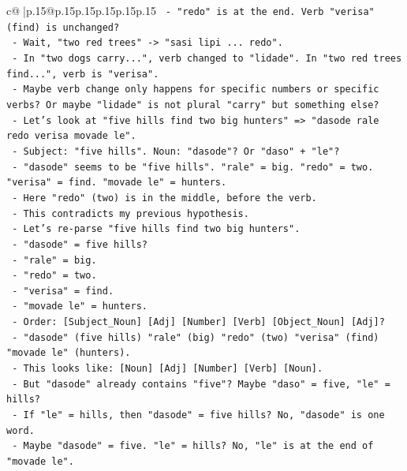 \documentclass{article}
\begin{document}
{\begin{supertabular}{c@{$\;$}|p{.15\linewidth}@{}p{.15\linewidth}p{.15\linewidth}p{.15\linewidth}p{.15\linewidth}p{.15\linewidth}}
{{{\texttt{        {-} "redo" is at the end. Verb "verisa" (find) is unchanged?} \\
\texttt{        {-} Wait, "two red trees" {-}> "sasi lipi ... redo".} \\
\texttt{        {-} In "two dogs carry...", verb changed to "lidade". In "two red trees find...", verb is "verisa".} \\
\texttt{        {-} Maybe verb change only happens for specific numbers or specific verbs? Or maybe "lidade" is not plural "carry" but something else?} \\
\texttt{        {-} Let's look at "five hills find two big hunters" => "dasode rale redo verisa movade le".} \\
\texttt{          {-} Subject: "five hills". Noun: "dasode"? Or "daso" + "le"?} \\
\texttt{          {-} "dasode" seems to be "five hills". "rale" = big. "redo" = two. "verisa" = find. "movade le" = hunters.} \\
\texttt{          {-} Here "redo" (two) is in the middle, before the verb.} \\
\texttt{          {-} This contradicts my previous hypothesis.} \\
\texttt{          {-} Let's re{-}parse "five hills find two big hunters".} \\
\texttt{            {-} "dasode" = five hills?} \\
\texttt{            {-} "rale" = big.} \\
\texttt{            {-} "redo" = two.} \\
\texttt{            {-} "verisa" = find.} \\
\texttt{            {-} "movade le" = hunters.} \\
\texttt{            {-} Order: {[}Subject\_Noun{]} {[}Adj{]} {[}Number{]} {[}Verb{]} {[}Object\_Noun{]} {[}Adj{]}?} \\
\texttt{            {-} "dasode" (five hills) "rale" (big) "redo" (two) "verisa" (find) "movade le" (hunters).} \\
\texttt{            {-} This looks like: {[}Noun{]} {[}Adj{]} {[}Number{]} {[}Verb{]} {[}Noun{]}.} \\
\texttt{            {-} But "dasode" already contains "five"? Maybe "daso" = five, "le" = hills?} \\
\texttt{            {-} If "le" = hills, then "dasode" = five hills? No, "dasode" is one word.} \\
\texttt{            {-} Maybe "dasode" = five. "le" = hills? No, "le" is at the end of "movade le".} \\
}}}
\end{supertabular}}
\end{document}
